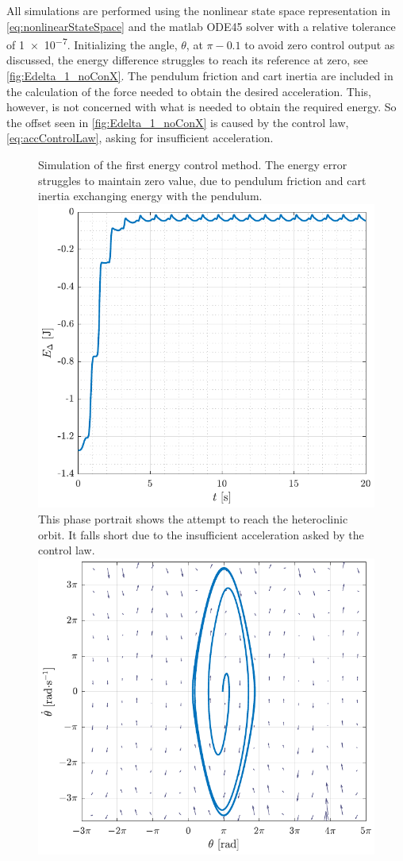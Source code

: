 All simulations are performed using the nonlinear state space representation in \autoref{eq:nonlinearStateSpace} and the matlab ODE45 solver with a relative tolerance of \SI{1e-7}{}. Initializing the angle, $\theta$, at $\pi-0.1$ to avoid zero control output as discussed, the energy difference struggles to reach its reference at zero, see \autoref{fig:Edelta_1_noConX}. The pendulum friction and cart inertia are included in the calculation of the force needed to obtain the desired acceleration. This, however, is not concerned with what is needed to obtain the required energy. So the offset seen in \autoref{fig:Edelta_1_noConX} is caused by the control law, \autoref{eq:accControlLaw}, asking for insufficient acceleration.
%
\begin{figure}[H]
  \hspace{-10pt}
  \captionbox
  {
    Simulation of the first energy control method. The energy error struggles to maintain zero value, due to pendulum friction and cart inertia exchanging energy with the pendulum.
    \label{fig:Edelta_1_noConX}
  }
  {
    \hspace{-1cm}
    \includegraphics[width=.455\textwidth]{figures/Edelta_1_noConX}
  }
  \hspace{20pt}
  \captionbox 
  {
    This phase portrait shows the attempt to reach the heteroclinic orbit. It falls short due to the insufficient acceleration asked by the control law.
    \label{fig:phase_1_noConX}
  }
  {
    \hspace{-1cm}
    \includegraphics[width=.46\textwidth]{figures/phase_1_noConX}
  }  
\end{figure}
